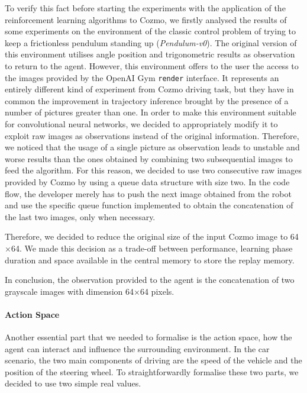 To verify this fact before starting the experiments with the application of the reinforcement learning algorithms to Cozmo, we firstly analysed the results of some experiments on the environment of the classic control problem of trying to keep a frictionless pendulum standing up (\textit{Pendulum-v0}).
The original version of this environment utilises angle position and trigonometric results as observation to return to the agent.
However, this environment offers to the user the access to the images provided by the OpenAI Gym \texttt{render} interface.
It represents an entirely different kind of experiment from Cozmo driving task, but they have in common the improvement in trajectory inference brought by the presence of a number of pictures greater than one.
In order to make this environment suitable for convolutional neural networks, we decided to appropriately modify it to exploit raw images as observations instead of the original information.
Therefore, we noticed that the usage of a single picture as observation leads to unstable and worse results than the ones obtained by combining two subsequential images to feed the algorithm.
For this reason, we decided to use two consecutive raw images provided by Cozmo by using a queue data structure with size two.
In the code flow, the developer merely has to push the next image obtained from the robot and use the specific queue function implemented to obtain the concatenation of the last two images, only when necessary.

Therefore, we decided to reduce the original size of the input Cozmo image to 64$\times$64.
We made this decision as a trade-off between performance, learning phase duration and space available in the central memory to store the replay memory.

In conclusion, the observation provided to the agent is the concatenation of two grayscale images with dimension 64$\times$64 pixels.

\paragraph{Action Space}

Another essential part that we needed to formalise is the action space, how the agent can interact and influence the surrounding environment.
In the car scenario, the two main components of driving are the speed of the vehicle and the position of the steering wheel.
To straightforwardly formalise these two parts, we decided to use two simple real values.


